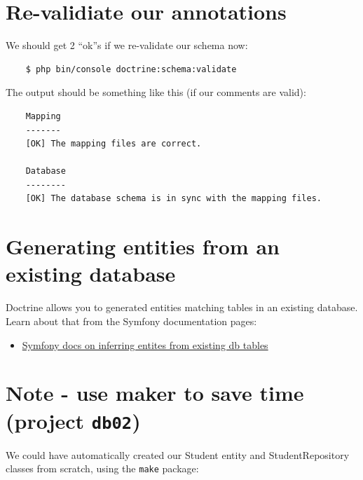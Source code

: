 \documentclass[a4paperpaper,openright]{book}
\providecommand{\tightlist}{%
  \setlength{\itemsep}{0pt}\setlength{\parskip}{0pt}}
\begin{document}
\hypertarget{re-validiate-our-annotations}{%
\section{Re-validiate our
annotations}\label{re-validiate-our-annotations}}

We should get 2 ``ok''s if we re-validate our schema now:

\begin{verbatim}
    $ php bin/console doctrine:schema:validate
\end{verbatim}

The output should be something like this (if our comments are valid):

\begin{verbatim}
    Mapping
    -------
    [OK] The mapping files are correct.

    Database
    --------
    [OK] The database schema is in sync with the mapping files.
\end{verbatim}

\hypertarget{generating-entities-from-an-existing-database}{%
\section{Generating entities from an existing
database}\label{generating-entities-from-an-existing-database}}

Doctrine allows you to generated entities matching tables in an existing
database. Learn about that from the Symfony documentation pages:

\begin{itemize}
\tightlist
\item
  \href{https://symfony.com/doc/current/doctrine/reverse_engineering.html}{Symfony
  docs on inferring entites from existing db tables}
\end{itemize}

\hypertarget{note---use-maker-to-save-time-project-db02}{%
\section{\texorpdfstring{Note - use maker to save time (project
\texttt{db02})}{Note - use maker to save time (project db02)}}\label{note---use-maker-to-save-time-project-db02}}

We could have automatically created our Student entity and
StudentRepository classes from scratch, using the \texttt{make} package:
\end{document}
